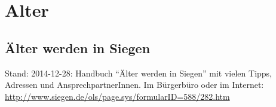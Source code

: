 \chapter{Alter}

\section{Älter werden in Siegen}
Stand: 2014-12-28: Handbuch \enquote{Älter werden in Siegen} mit vielen Tipps, Adressen und AnsprechpartnerInnen. Im Bürgerbüro oder im Internet:  \href{http://www.siegen.de/ols/page.sys/formularID=588/282.htm}{http://www.siegen.de/ols/page.sys/formularID=588/282.htm} 
